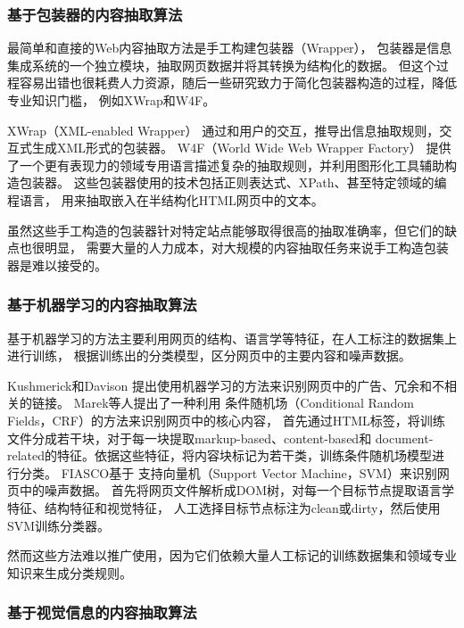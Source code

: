 \subsubsection{基于包装器的内容抽取算法}

最简单和直接的Web内容抽取方法是手工构建包装器（Wrapper），
包装器是信息集成系统的一个独立模块，抽取网页数据并将其转换为结构化的数据。
但这个过程容易出错也很耗费人力资源，随后一些研究致力于简化包装器构造的过程，降低专业知识门槛，
例如XWrap和W4F。

XWrap（XML-enabled Wrapper）
通过和用户的交互，推导出信息抽取规则，交互式生成XML形式的包装器。
W4F（World Wide Web Wrapper Factory）
提供了一个更有表现力的领域专用语言描述复杂的抽取规则，并利用图形化工具辅助构造包装器。
这些包装器使用的技术包括正则表达式、XPath、甚至特定领域的编程语言，
用来抽取嵌入在半结构化HTML网页中的文本。

虽然这些手工构造的包装器针对特定站点能够取得很高的抽取准确率，但它们的缺点也很明显，
需要大量的人力成本，对大规模的内容抽取任务来说手工构造包装器是难以接受的。

\subsubsection{基于机器学习的内容抽取算法}

基于机器学习的方法主要利用网页的结构、语言学等特征，在人工标注的数据集上进行训练，
根据训练出的分类模型，区分网页中的主要内容和噪声数据。

Kushmerick和Davison
提出使用机器学习的方法来识别网页中的广告、冗余和不相关的链接。
Marek等人提出了一种利用
条件随机场（Conditional Random Fields，CRF）的方法来识别网页中的核心内容，
首先通过HTML标签，将训练文件分成若干块，对于每一块提取markup-based、content-based和
document-related的特征。依据这些特征，将内容块标记为若干类，训练条件随机场模型进行分类。
FIASCO基于
支持向量机（Support Vector Machine，SVM）来识别网页中的噪声数据。
首先将网页文件解析成DOM树，对每一个目标节点提取语言学特征、结构特征和视觉特征，
人工选择目标节点标注为clean或dirty，然后使用SVM训练分类器。

然而这些方法难以推广使用，因为它们依赖大量人工标记的训练数据集和领域专业知识来生成分类规则。

\subsubsection{基于视觉信息的内容抽取算法}

